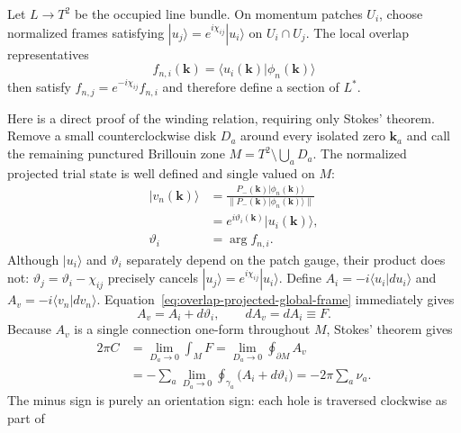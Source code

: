 \documentclass[aps,prx,twocolumn,floatfix,nofootinbib,superscriptaddress,longbibliography]{revtex4-2}
\begin{document}
Let $L\to T^2$ be the occupied line bundle.  On momentum patches $U_i$, choose normalized
frames satisfying $|u_j\rangle=e^{i\chi_{ij}}|u_i\rangle$ on $U_i\cap U_j$.  The local
overlap representatives
\begin{equation}
 f_{n,i}(\mathbf{k})=\langle u_i(\mathbf{k})|\phi_n(\mathbf{k})\rangle
 \label{eq:overlap-local-representative}
\end{equation}
then satisfy $f_{n,j}=e^{-i\chi_{ij}}f_{n,i}$ and therefore define a section of $L^*$.

Here is a direct proof of the winding relation, requiring only Stokes' theorem.  Remove a
small counterclockwise disk $D_a$ around every isolated zero $\mathbf{k}_a$ and call the
remaining punctured Brillouin zone
$M=T^2\setminus\bigcup_aD_a$.  The normalized projected trial state is well defined and
single valued on $M$:
\begin{equation}
 \begin{aligned}
 |v_n(\mathbf{k})\rangle
 &=\frac{P_-(\mathbf{k})|\phi_n(\mathbf{k})\rangle}
 {\|P_-(\mathbf{k})|\phi_n(\mathbf{k})\rangle\|}\\
 &=e^{i\vartheta_i(\mathbf{k})}|u_i(\mathbf{k})\rangle,\\
 \vartheta_i&=\arg f_{n,i}.
 \end{aligned}
 \label{eq:overlap-projected-global-frame}
\end{equation}
Although $|u_i\rangle$ and $\vartheta_i$ separately depend on the patch gauge, their
product does not: $\vartheta_j=\vartheta_i-\chi_{ij}$ precisely cancels
$|u_j\rangle=e^{i\chi_{ij}}|u_i\rangle$.  Define
$A_i=-i\langle u_i|d u_i\rangle$ and
$A_v=-i\langle v_n|d v_n\rangle$.  Equation~\eqref{eq:overlap-projected-global-frame}
immediately gives
\begin{equation}
 A_v=A_i+d\vartheta_i,
 \qquad dA_v=dA_i\equiv F.
 \label{eq:overlap-connection-shift}
\end{equation}
Because $A_v$ is a single connection one-form throughout $M$, Stokes' theorem gives
\begin{equation}
 \begin{aligned}
  2\pi C
  &=\lim_{D_a\to0}\int_M F
    =\lim_{D_a\to0}\oint_{\partial M}A_v\\
  &=-\sum_a\lim_{D_a\to0}\oint_{\gamma_a}
    \bigl(A_i+d\vartheta_i\bigr)
    =-2\pi\sum_a\nu_a.
 \end{aligned}
 \label{eq:overlap-stokes-proof}
\end{equation}
The minus sign is purely an orientation sign: each hole is traversed clockwise as part of
\end{document}
